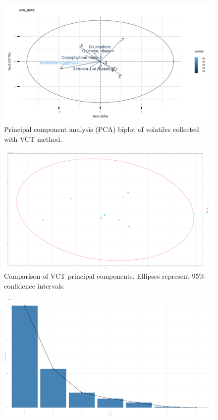 \documentclass{ufdissertation}[overrideChapters] %
\begin{document}
{\begin{figure}
{\centering \includegraphics[width=1\linewidth]{figure/rrv_volatiles_biplot_var_pca_qsep} 

}

\caption[Principal component analysis (PCA) biplot of volatiles collected with VCT]{Principal component analysis (PCA) biplot of volatiles collected with VCT method.}\label{fig:qsep-vocs}
\end{figure}
\begin{figure}

{\centering \includegraphics[width=1\linewidth]{figure/rrv_volatiles_comparison_pca_comp_qsep} 

}

\caption[Comparison of VCT principal components]{Comparison of VCT principal components. Ellipses represent 95\% confidence intervals.}\label{fig:qsep-vocs-compares}
\end{figure}
\begin{figure}

{\centering \includegraphics[width=1\linewidth]{figure/rrv_volatiles_screeplot_pca_qsep} 

}
\end{figure}}
\end{document}
